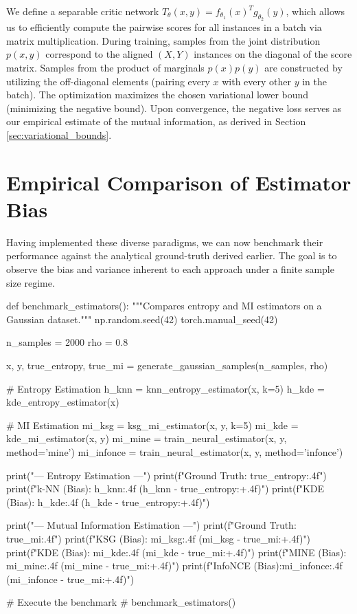 We define a separable critic network $T_\theta(x, y) = f_{\theta_1}(x)^T g_{\theta_2}(y)$, which allows us to efficiently compute the pairwise scores for all instances in a batch via matrix multiplication. During training, samples from the joint distribution $p(x, y)$ correspond to the aligned $(X, Y)$ instances on the diagonal of the score matrix. Samples from the product of marginals $p(x)p(y)$ are constructed by utilizing the off-diagonal elements (pairing every $x$ with every other $y$ in the batch). The optimization maximizes the chosen variational lower bound (minimizing the negative bound). Upon convergence, the negative loss serves as our empirical estimate of the mutual information, as derived in Section \ref{sec:variational_bounds}.

\section{Empirical Comparison of Estimator Bias}

Having implemented these diverse paradigms, we can now benchmark their performance against the analytical ground-truth derived earlier. The goal is to observe the bias and variance inherent to each approach under a finite sample size regime.

\begin{pycode}
def benchmark_estimators():
    """Compares entropy and MI estimators on a Gaussian dataset."""
    np.random.seed(42)
    torch.manual_seed(42)
    
    n_samples = 2000
    rho = 0.8
    
    x, y, true_entropy, true_mi = generate_gaussian_samples(n_samples, rho)
    
    # Entropy Estimation
    h_knn = knn_entropy_estimator(x, k=5)
    h_kde = kde_entropy_estimator(x)
    
    # MI Estimation
    mi_ksg = ksg_mi_estimator(x, y, k=5)
    mi_kde = kde_mi_estimator(x, y)
    mi_mine = train_neural_estimator(x, y, method='mine')
    mi_infonce = train_neural_estimator(x, y, method='infonce')
    
    print("--- Entropy Estimation ---")
    print(f"Ground Truth: {true_entropy:.4f}")
    print(f"k-NN (Bias):  {h_knn:.4f} ({h_knn - true_entropy:+.4f})")
    print(f"KDE (Bias):   {h_kde:.4f} ({h_kde - true_entropy:+.4f})")
    
    print("\n--- Mutual Information Estimation ---")
    print(f"Ground Truth:  {true_mi:.4f}")
    print(f"KSG (Bias):    {mi_ksg:.4f} ({mi_ksg - true_mi:+.4f})")
    print(f"KDE (Bias):    {mi_kde:.4f} ({mi_kde - true_mi:+.4f})")
    print(f"MINE (Bias):   {mi_mine:.4f} ({mi_mine - true_mi:+.4f})")
    print(f"InfoNCE (Bias):{mi_infonce:.4f} ({mi_infonce - true_mi:+.4f})")

# Execute the benchmark
# benchmark_estimators()
\end{pycode}

